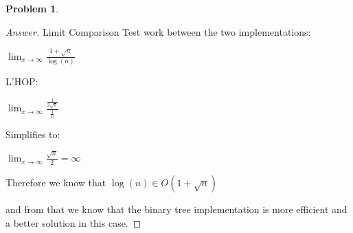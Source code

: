 \documentclass[11pt]{article}
\theoremstyle{definition}
\theoremstyle{definition}
\newtheorem{required}{Problem}
\theoremstyle{definition}
\begin{document}
\begin{required}
\begin{enumerate}[label=(\alph*)]
\begin{proof}[Answer]
Limit Comparison Test work between the two implementations:

$\lim_{x\to\infty} \frac{1+\sqrt{n}}{\log(n)}$

L'HOP:

$\lim_{x\to\infty} \frac{\frac{1}{2\sqrt{n}}}{\frac{1}{n}}$

Simplifies to:

$\lim_{x\to\infty} \frac{\sqrt{n}}{2} = \infty$

Therefore we know that $\log(n) \in O(1+\sqrt{n})$

and from that we know that the binary tree implementation is more efficient and a better solution in this case.



\end{proof}

\end{enumerate}
\end{required}
\end{document}
